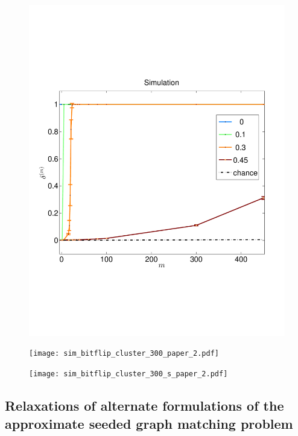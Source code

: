 \documentclass[12pt,oneside,final]{thesis}\usepackage[]{graphicx}\usepackage[]{color}
\begin{document}
\begin{figure}
 \centering
  \caption{
 \label{sim_bitflip_rqap}}
 \includegraphics[width=1.2\textwidth]{sim_bitflip-paper600.pdf}
\end{figure}

\begin{figure}
 \centering
  \caption{
 \label{sim_bitflip_rqap}}
 \texttt{[image: sim\_bitflip\_cluster\_300\_paper\_2.pdf]}
\end{figure}

\begin{figure}
 \centering
  \caption{
 \label{sim_bitflip_rqap}}
 \texttt{[image: sim\_bitflip\_cluster\_300\_s\_paper\_2.pdf]}
\end{figure}


\subsection{Relaxations of alternate formulations of the approximate seeded graph matching problem \label{subsec:rqap2}}
\end{document}
